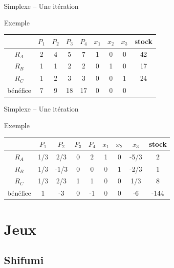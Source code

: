 \documentclass{beamer}
\begin{document}
 \begin{frame}{Simplexe -- Une itération}

    \begin{exampleblock}{Exemple}
      \begin{center}
        \begin{tabular}{|c|ccccccc|c|}\hline
          & $P_1$ & $P_2$ & $P_3$ & $P_4$ & $x_1$ & $x_2$ & $x_3$ & stock \\ \hline
          $R_A$ & 2 & 4 & \color{blue}5\color{black} & 7 & 1 & 0 & 0 & 42 \\
          $R_B$ & 1 & 1 & \color{blue}2\color{black} & 2 & 0 & 1 & 0 & 17 \\
          $R_C$ & 1 & 2 & \color{red}3\color{black} & 3 & 0 & 0 & 1 & 24 \\ \hline
          bénéfice & 7 & 9 & \color{red}18\color{black} & 17 & 0 & 0 & 0 & \\ \hline
        \end{tabular}
      \end{center}
    \end{exampleblock}
  \end{frame}
\begin{frame}{Simplexe -- Une itération}

    \begin{exampleblock}{Exemple}
      \begin{center}
        \begin{tabular}{|c|ccccccc|c|}\hline
          & $P_1$ & $P_2$ & $P_3$ & $P_4$ & $x_1$ & $x_2$ & $x_3$ & stock \\ \hline
          $R_A$ & 1/3 & 2/3 & 0 & 2 & 1 & 0 & -5/3 & 2 \\
          $R_B$ & 1/3 & -1/3 & 0 & 0 & 0 & 1 & -2/3 & 1 \\
          $R_C$ & 1/3 & 2/3 & 1 & 1 & 0 & 0 & 1/3 & 8 \\ \hline
          bénéfice & 1 & -3 & 0 & -1 & 0 & 0 & -6 & -144 \\ \hline
        \end{tabular}
      \end{center}
    \end{exampleblock}
  \end{frame}

\section{Jeux}
\subsection{Shifumi}
\end{document}
